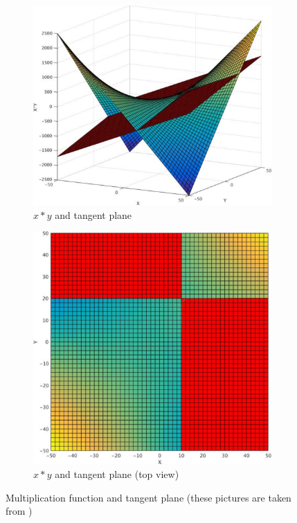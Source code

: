 \begin{figure}[ht!]
\par\bigskip
\par\bigskip
\par\bigskip
\par\bigskip
\par\bigskip
\par\bigskip
\par\bigskip
\begin{subfigure}{.5\textwidth}
  \centering
  \includegraphics[width=.9\linewidth]{./figures/phdWork_MFunc_c.pdf}
  \caption{$x \ast y$ and tangent plane}
  \label{fig:sfig1}
\end{subfigure}%
\begin{subfigure}{.5\textwidth}
  \centering
  \includegraphics[width=.9\linewidth]{./figures/phdWork_MFunc_d.pdf}
  \caption{$x \ast y$ and tangent plane  (top view)}
  \label{fig:sfig2}
\end{subfigure}
\caption{Multiplication function and tangent plane (these pictures are taken from \cite{Cimatti:2018:ILS:3274693.3230639})}
\label{fig:Tangent_Plane_Graph}
\end{figure}\newpage

